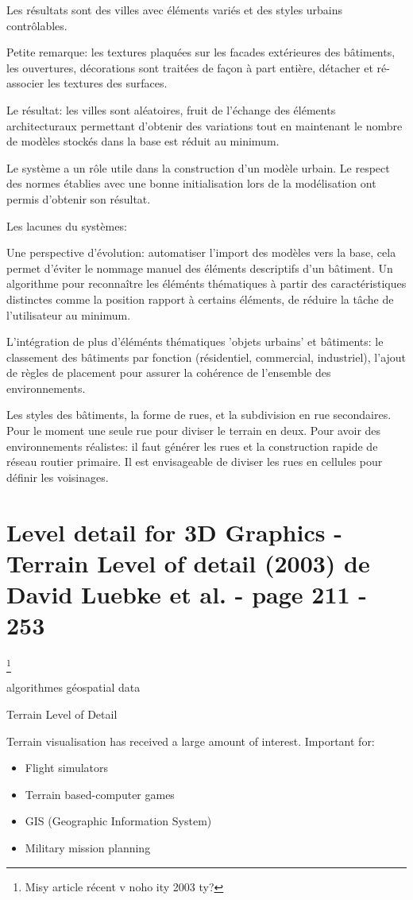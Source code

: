 \documentclass[11pt]{report}
\begin{document}
Les résultats sont des villes avec éléments variés et des styles urbains contrôlables.

Petite remarque: les textures plaquées sur les facades extérieures des bâtiments, les ouvertures, décorations sont traitées de façon à part entière, détacher et ré-associer les textures des surfaces.

Le résultat: les villes sont aléatoires, fruit de l'échange des éléments architecturaux permettant d'obtenir des variations tout en maintenant le nombre de modèles stockés dans la base est réduit au minimum. 

Le système a un rôle utile dans la construction d'un modèle urbain.
Le respect des normes établies avec une bonne initialisation lors de la modélisation ont permis d'obtenir son résultat.

Les lacunes du systèmes:

Une perspective d'évolution: automatiser l'import des modèles vers la base, cela permet d'éviter le nommage manuel des éléments descriptifs d'un bâtiment. Un algorithme pour reconnaître les éléménts thématiques à partir des caractéristiques distinctes comme la position rapport à certains éléments, de réduire la tâche de l'utilisateur au minimum.

L'intégration de plus d'éléménts thématiques 'objets urbains' et bâtiments: le classement des bâtiments par fonction (résidentiel, commercial, industriel), l'ajout de règles de placement pour assurer la cohérence de l'ensemble des environnements.

Les styles des bâtiments, la forme de rues, et la subdivision en rue secondaires. 
Pour le moment une seule rue pour diviser le terrain en deux. Pour avoir des environnements réalistes: il faut générer les rues et la construction rapide de réseau routier primaire. Il est envisageable de diviser les rues en cellules pour définir les voisinages.



\part{Level detail for 3D Graphics - Terrain Level of detail (2003) de David Luebke et al. - page 211 - 253}\footnote{Misy article récent v noho ity 2003 ty?}

algorithmes
géospatial data

Terrain Level of Detail

Terrain visualisation has received a large amount of interest.
Important for:
\begin{itemize}
	\item Flight simulators 
	\item Terrain based-computer games
	\item GIS (Geographic Information System)
	\item Military mission planning
\end{itemize}
\end{document}
